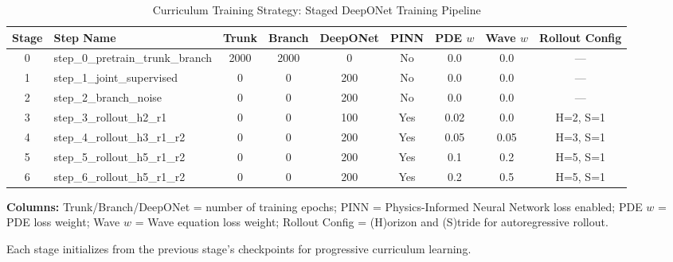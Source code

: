 \begin{table}[h!]
\centering
\caption{Curriculum Training Strategy: Staged DeepONet Training Pipeline}
\label{tab:curriculum}
\small
\begin{tabularx}{\textwidth}{|c|l|c|c|c|c|c|c|c|}
\hline
\textbf{Stage} & \textbf{Step Name} & \textbf{Trunk} & \textbf{Branch} & \textbf{DeepONet} & \textbf{PINN} & \textbf{PDE $w$} & \textbf{Wave $w$} & \textbf{Rollout Config} \\
\hline
0 & step\_0\_pretrain\_trunk\_branch & 2000 & 2000 & 0 & No & 0.0 & 0.0 & --- \\
1 & step\_1\_joint\_supervised & 0 & 0 & 200 & No & 0.0 & 0.0 & --- \\
2 & step\_2\_branch\_noise & 0 & 0 & 200 & No & 0.0 & 0.0 & --- \\
3 & step\_3\_rollout\_h2\_r1 & 0 & 0 & 100 & Yes & 0.02 & 0.0 & H=2, S=1 \\
4 & step\_4\_rollout\_h3\_r1\_r2 & 0 & 0 & 200 & Yes & 0.05 & 0.05 & H=3, S=1 \\
5 & step\_5\_rollout\_h5\_r1\_r2 & 0 & 0 & 200 & Yes & 0.1 & 0.2 & H=5, S=1 \\
6 & step\_6\_rollout\_h5\_r1\_r2 & 0 & 0 & 200 & Yes & 0.2 & 0.5 & H=5, S=1 \\
\hline
\end{tabularx}
\vspace{0.5em}
\begin{tablenotes}
\small
\item \textbf{Columns:} Trunk/Branch/DeepONet = number of training epochs; PINN = Physics-Informed Neural Network loss enabled; PDE $w$ = PDE loss weight; Wave $w$ = Wave equation loss weight; Rollout Config = (H)orizon and (S)tride for autoregressive rollout.
\item Each stage initializes from the previous stage's checkpoints for progressive curriculum learning.
\end{tablenotes}
\end{table}